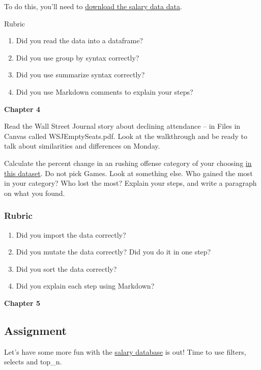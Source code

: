\documentclass[]{book}
\providecommand{\tightlist}{%
  \setlength{\itemsep}{0pt}\setlength{\parskip}{0pt}}
\begin{document}
To do this, you'll need to
\href{https://www.dropbox.com/s/xts9xsim3lpg7qu/nusalaries1819.csv?dl=0}{download
the salary data data}.

Rubric

\begin{enumerate}
\def\labelenumi{\arabic{enumi}.}
\tightlist
\item
  Did you read the data into a dataframe?
\item
  Did you use group by syntax correctly?
\item
  Did you use summarize syntax correctly?
\item
  Did you use Markdown comments to explain your steps?
\end{enumerate}

\textbf{Chapter 4}

Read the Wall Street Journal story about declining attendance -- in
Files in Canvas called WSJEmptySeats.pdf. Look at the walkthrough and be
ready to talk about similarities and differences on Monday.

Calculate the percent change in an rushing offense category of your
choosing
\href{https://www.dropbox.com/s/bxqmzntkwhqn24e/rushingoffense.csv?dl=0}{in
this dataset}. Do not pick Games. Look at something else. Who gained the
most in your category? Who lost the most? Explain your steps, and write
a paragraph on what you found.

\subsubsection{Rubric}\label{rubric}

\begin{enumerate}
\def\labelenumi{\arabic{enumi}.}
\tightlist
\item
  Did you import the data correctly?
\item
  Did you mutate the data correctly? Did you do it in one step?
\item
  Did you sort the data correctly?
\item
  Did you explain each step using Markdown?
\end{enumerate}

\textbf{Chapter 5}

\subsection{Assignment}\label{assignment}

Let's have some more fun with the
\href{https://www.dropbox.com/s/xts9xsim3lpg7qu/nusalaries1819.csv?dl=0}{salary
database} is out! Time to use filters, selects and top\_n.
\end{document}
